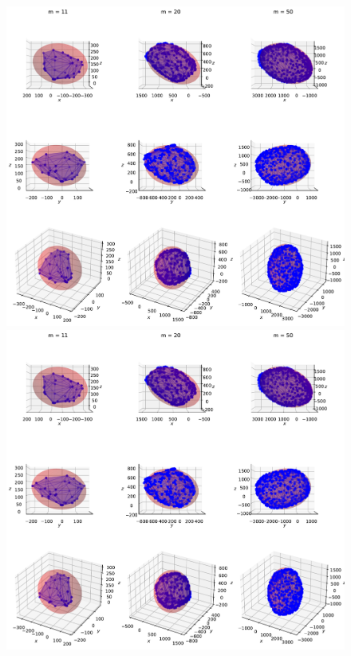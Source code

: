\begin{figure}[!htb]
\begin{minipage}{1\linewidth}
    \end{minipage}
    \begin{minipage}{1\linewidth}
        \centering
        \includegraphics[trim={0 255 0 300},clip, width=0.9\linewidth]{img/chapter_3/myIma5_projection_constant.pdf}
    \end{minipage}
    \begin{minipage}{1\linewidth}
        \centering
        \includegraphics[trim={0 0 0 500},clip, width=0.9\linewidth]{img/chapter_3/myIma5_projection_constant.pdf}
    \end{minipage}
    

\end{figure}
